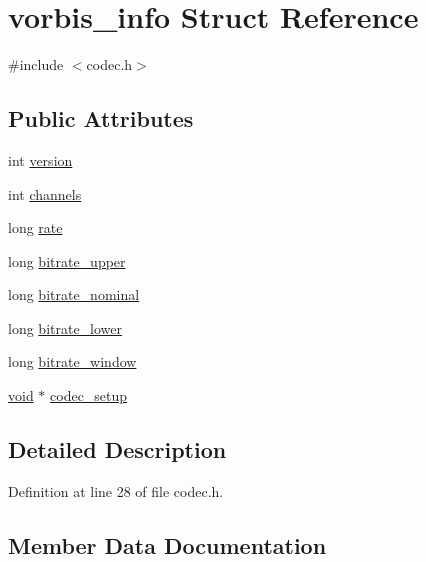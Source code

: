 \hypertarget{structvorbis__info}{}\section{vorbis\+\_\+info Struct Reference}
\label{structvorbis__info}


{\ttfamily \#include $<$codec.\+h$>$}

\subsection*{Public Attributes}
\begin{DoxyCompactItemize}
\item 
int \mbox{\hyperlink{structvorbis__info_a2d832259b1e3fbf4d1cd619ab5743612}{version}}
\item 
int \mbox{\hyperlink{structvorbis__info_a4240e042b91744b4fd810426f18252b4}{channels}}
\item 
long \mbox{\hyperlink{structvorbis__info_a01879ed23ecd9605cf6779ef2663a681}{rate}}
\item 
long \mbox{\hyperlink{structvorbis__info_a2d9d0e0725ae71c855ad39ce07bf7c88}{bitrate\+\_\+upper}}
\item 
long \mbox{\hyperlink{structvorbis__info_a71127d3e35c30fa110d7f321302a91b8}{bitrate\+\_\+nominal}}
\item 
long \mbox{\hyperlink{structvorbis__info_a216284288febd46a5547901cd5e6cd62}{bitrate\+\_\+lower}}
\item 
long \mbox{\hyperlink{structvorbis__info_aa511ecfc9eee8129df8f70e62ed08dc7}{bitrate\+\_\+window}}
\item 
\mbox{\hyperlink{_s_d_l__opengles2__gl2ext_8h_ae5d8fa23ad07c48bb609509eae494c95}{void}} $\ast$ \mbox{\hyperlink{structvorbis__info_a440988f081a417fd1586a4c3d44bc00c}{codec\+\_\+setup}}
\end{DoxyCompactItemize}


\subsection{Detailed Description}


Definition at line 28 of file codec.\+h.



\subsection{Member Data Documentation}
\mbox{\label{structvorbis__info_a216284288febd46a5547901cd5e6cd62}} 
